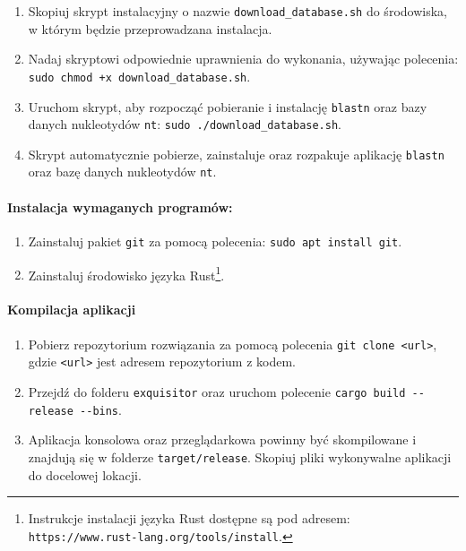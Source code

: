                 \begin{enumerate}
                    \item {
                        Skopiuj skrypt instalacyjny o nazwie \texttt{download\_database.sh} do środowiska, w którym będzie przeprowadzana instalacja.
                    }
                    \item {
                        Nadaj skryptowi odpowiednie uprawnienia do wykonania, używając polecenia: \texttt{sudo chmod +x download\_database.sh}.
                    }
                    \item {
                        Uruchom skrypt, aby rozpocząć pobieranie i instalację \texttt{blastn} oraz bazy danych nukleotydów \texttt{nt}: \texttt{sudo ./download\_database.sh}.
                    }
                    \item {
                        Skrypt automatycznie pobierze, zainstaluje oraz rozpakuje aplikację \texttt{blastn} oraz bazę danych nukleotydów \texttt{nt}.
                    }
                \end{enumerate}

            \paragraph{Instalacja wymaganych programów:}

                \begin{enumerate}
                    \item {
                        Zainstaluj pakiet \texttt{git} za pomocą polecenia: \texttt{sudo apt install git}.
                    }
                    \item {
                        Zainstaluj środowisko języka Rust\footnote{Instrukcje instalacji języka Rust dostępne są pod adresem: \texttt{https://www.rust-lang.org/tools/install}.}.
                    }
                \end{enumerate}

            \paragraph{Kompilacja aplikacji}
                
                \begin{enumerate}
                    \item {
                        Pobierz repozytorium rozwiązania za pomocą polecenia \texttt{git clone <url>}, gdzie \texttt{<url>} jest adresem repozytorium z kodem.
                    }
                    \item {
                        Przejdź do folderu \texttt{exquisitor} oraz uruchom polecenie \texttt{cargo build -\phantom{}-release -\phantom{}-bins}.
                    }
                    \item {
                        Aplikacja konsolowa oraz przeglądarkowa powinny być skompilowane i znajdują się w folderze \texttt{target/release}. 
                        Skopiuj pliki wykonywalne aplikacji do docelowej lokacji.
                    }
                \end{enumerate}
            
